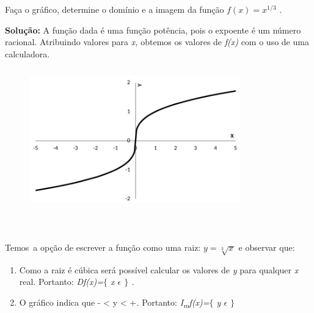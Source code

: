 \begin{texemplo}
	
Faça o gráfico, determine o domínio e a imagem da função  \( f \left( x \right) =x^{1/3} \) .

\textbf{Solução:} A função dada é uma função potência, pois o expoente é um número racional. Atribuindo valores para \textit{x,} obtemos os valores de \textit{f(x)} com o uso de uma calculadora. 

\begin{figure}[H]
	\begin{Center}
		\includegraphics[width=3.6in,height=2.41in]{capitulos/outras_funcoes/media/image4.pdf}
	\end{Center}
\end{figure}

~~

\quad 

Temos~a opção de escrever a função como uma raiz:   \( y=\sqrt[3]{x^{}} \)  e observar que: 

\begin{enumerate}
	\item Como a raiz é cúbica será possível calcular os valores de \textit{y} para qualquer  \textit{x} real. Portanto: \textit{Df(x)=$ \{ $  x $ \epsilon $  \textbf{ }$ \} $ .}

	\item \textit{ }O gráfico indica que - < y < +\textit{. } Portanto: \textit{I\textsubscript{m}f(x)=$ \{ $ y $ \epsilon $  $ \} $  }\qedsymbol{} 
\end{enumerate}
\end{texemplo}

